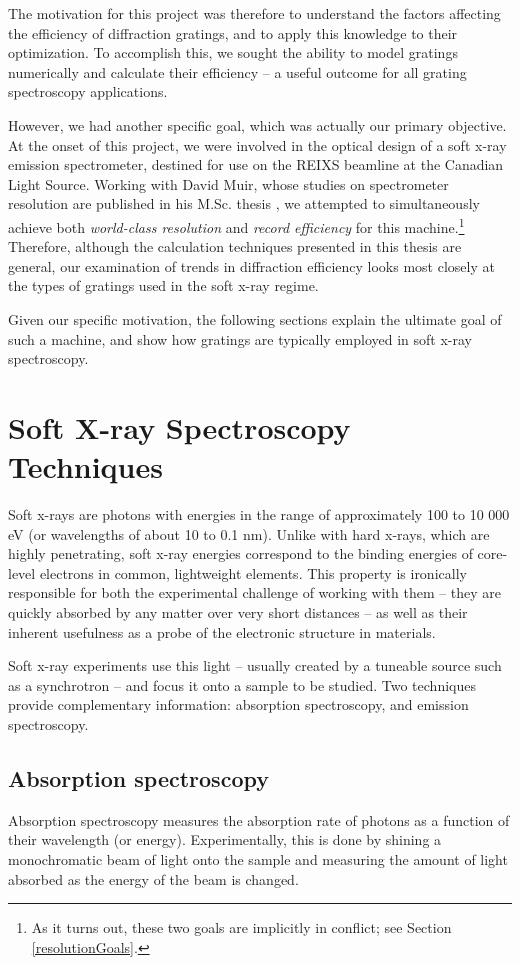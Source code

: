 The motivation for this project was therefore to understand the factors affecting the efficiency of diffraction gratings, and to apply this knowledge to their optimization.  To accomplish this, we sought the ability to model gratings numerically and calculate their efficiency -- a useful outcome for all grating spectroscopy applications.  

However, we had another specific goal, which was actually our primary objective.  At the onset of this project, we were involved in the optical design of a soft x-ray emission spectrometer, destined for use on the REIXS beamline at the Canadian Light Source.  Working with David Muir, whose studies on spectrometer resolution are published in his M.Sc. thesis \cite{Mui06}, we attempted to simultaneously achieve both \emph{world-class resolution} and \emph{record efficiency} for this machine.\footnote{As it turns out, these two goals are implicitly in conflict; see Section \ref{resolutionGoals}.}  Therefore, although the calculation techniques presented in this thesis are general, our examination of trends in diffraction efficiency looks most closely at the types of gratings used in the soft x-ray regime.

Given our specific motivation, the following sections explain the ultimate goal of such a machine, and show how gratings are typically employed in soft x-ray spectroscopy.

\section{Soft X-ray Spectroscopy Techniques}
Soft x-rays are photons with energies in the range of approximately 100 to 10 000 eV (or wavelengths of about 10 to 0.1 nm).  Unlike with hard x-rays, which are highly penetrating, soft x-ray energies correspond to the binding energies of core-level electrons in common, lightweight elements.  This property is ironically responsible for both the experimental challenge of working with them -- they are quickly absorbed by any matter over very short distances -- as well as their inherent usefulness as a probe of the electronic structure in materials.

Soft x-ray experiments use this light -- usually created by a tuneable source such as a synchrotron -- and focus it onto a sample to be studied.  Two techniques provide complementary information: absorption spectroscopy, and emission spectroscopy.

\subsection{Absorption spectroscopy}
Absorption spectroscopy measures the absorption rate of photons as a function of their wavelength (or energy).  Experimentally, this is done by shining a monochromatic beam of light onto the sample and measuring the amount of light absorbed as the energy of the beam is changed.  

